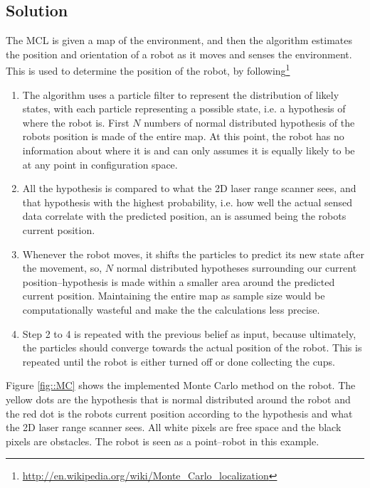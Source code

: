 \subsection{Solution}
The MCL is given a map of the environment, and then the algorithm estimates the position and orientation of a robot as it moves and senses the environment. This is used to determine the position of the robot, by following\footnote{\url{http://en.wikipedia.org/wiki/Monte_Carlo_localization}} 
\begin{enumerate}\itemsep-2pt
\item The algorithm uses a particle filter to represent the distribution of likely states, with each particle representing a possible state, i.e. a hypothesis of where the robot is. First $N$ numbers of normal distributed hypothesis of the robots position is made of the entire map. At this point, the robot has no information about where it is and can only assumes it is equally likely to be at any point in configuration space.
\item All the hypothesis is compared to what the 2D laser range scanner sees, and that hypothesis with the highest probability, i.e. how well the actual sensed data correlate with the predicted position, an is assumed being the robots current position.
\item Whenever the robot moves, it shifts the particles to predict its new state after the movement, so, $N$ normal distributed hypotheses surrounding our current position--hypothesis is made within a smaller area around the predicted current position. Maintaining the entire map as sample size would be computationally wasteful and make the the calculations less precise.
\item Step 2 to 4 is repeated with the previous belief as input, because ultimately, the particles should converge towards the actual position of the robot. This is repeated until the robot is either turned off or done collecting the cups.
\end{enumerate}
Figure \ref{fig::MC} shows the implemented Monte Carlo method on the robot. The yellow dots are the hypothesis that is normal distributed around the robot and the red dot is the robots current position according to the hypothesis and what the 2D laser range scanner sees. All white pixels are free space and the black pixels are obstacles. The robot is seen as a point--robot in this example.\\[0.2cm]

